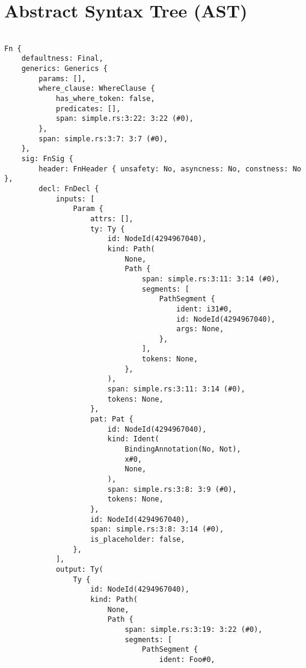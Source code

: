 \documentclass[
  11pt,
  twoside,symmetric]{report}
\begin{document}
\clearpage

\section{Abstract Syntax Tree (AST)}\label{abstract-syntax-tree-ast}

\begin{verbatim}

Fn {
    defaultness: Final,
    generics: Generics {
        params: [],
        where_clause: WhereClause {
            has_where_token: false,
            predicates: [],
            span: simple.rs:3:22: 3:22 (#0),
        },
        span: simple.rs:3:7: 3:7 (#0),
    },
    sig: FnSig {
        header: FnHeader { unsafety: No, asyncness: No, constness: No },
        decl: FnDecl {
            inputs: [
                Param {
                    attrs: [],
                    ty: Ty {
                        id: NodeId(4294967040),
                        kind: Path(
                            None,
                            Path {
                                span: simple.rs:3:11: 3:14 (#0),
                                segments: [
                                    PathSegment {
                                        ident: i31#0,
                                        id: NodeId(4294967040),
                                        args: None,
                                    },
                                ],
                                tokens: None,
                            },
                        ),
                        span: simple.rs:3:11: 3:14 (#0),
                        tokens: None,
                    },
                    pat: Pat {
                        id: NodeId(4294967040),
                        kind: Ident(
                            BindingAnnotation(No, Not),
                            x#0,
                            None,
                        ),
                        span: simple.rs:3:8: 3:9 (#0),
                        tokens: None,
                    },
                    id: NodeId(4294967040),
                    span: simple.rs:3:8: 3:14 (#0),
                    is_placeholder: false,
                },
            ],
            output: Ty(
                Ty {
                    id: NodeId(4294967040),
                    kind: Path(
                        None,
                        Path {
                            span: simple.rs:3:19: 3:22 (#0),
                            segments: [
                                PathSegment {
                                    ident: Foo#0,

\end{verbatim}
\end{document}
